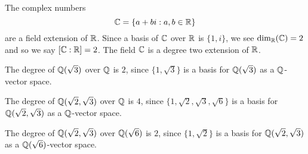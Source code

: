 \documentclass{ximera}
\begin{document}
\begin{example}
  The complex numbers
  \[
  \mathbb C = \{a+bi:a,b\in\mathbb R\}
  \]
  are a field extension of $\mathbb R$. Since a basis of $\mathbb C$ over $\mathbb R$ is
  $\{1,i\}$, we see $\dim_\mathbb R(\mathbb C)=2$ and so we say $[\mathbb C:\mathbb R]=2$. The
  field $\mathbb C$ is a degree two extension of $\mathbb R$.
\end{example}

\begin{example}
  The degree of $\mathbb Q(\sqrt{3})$ over $\mathbb Q$ is $2$, since
  $\{1,\sqrt{3}\}$ is a basis for $\mathbb Q(\sqrt{3})$ as a $\mathbb Q$-vector
  space.
\end{example}


\begin{example}
  The degree of $\mathbb Q(\sqrt{2},\sqrt{3})$ over $\mathbb Q$ is $4$, since
  $\{1,\sqrt{2},\sqrt{3},\sqrt{6}\}$ is a basis for
  $\mathbb Q(\sqrt{2},\sqrt{3})$ as a $\mathbb Q$-vector space.
\end{example}

\begin{example}
  The degree of $\mathbb Q(\sqrt{2},\sqrt{3})$ over $\mathbb Q(\sqrt{6})$ is $2$, since
  $\{1,\sqrt{2}\}$ is a basis for
  $\mathbb Q(\sqrt{2},\sqrt{3})$ as a $\mathbb Q(\sqrt{6})$-vector space.
\end{example}
\end{document}
